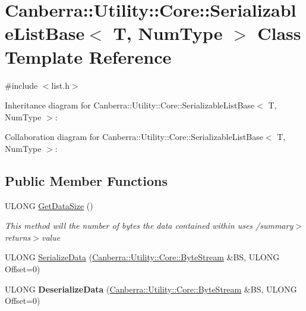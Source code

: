 \hypertarget{class_canberra_1_1_utility_1_1_core_1_1_serializable_list_base}{}\section{Canberra\+:\+:Utility\+:\+:Core\+:\+:Serializable\+List\+Base$<$ T, Num\+Type $>$ Class Template Reference}
\label{class_canberra_1_1_utility_1_1_core_1_1_serializable_list_base}


{\ttfamily \#include $<$list.\+h$>$}



Inheritance diagram for Canberra\+:\+:Utility\+:\+:Core\+:\+:Serializable\+List\+Base$<$ T, Num\+Type $>$\+:


Collaboration diagram for Canberra\+:\+:Utility\+:\+:Core\+:\+:Serializable\+List\+Base$<$ T, Num\+Type $>$\+:
\subsection*{Public Member Functions}
\begin{DoxyCompactItemize}
\item 
U\+L\+O\+NG \hyperlink{class_canberra_1_1_utility_1_1_core_1_1_serializable_list_base_a98ebee1f5c5ff3357e2602c0201c95f0_a98ebee1f5c5ff3357e2602c0201c95f0}{Get\+Data\+Size} ()
\begin{DoxyCompactList}\small\item\em This method will the number of bytes the data contained within uses /summary$>$ returns$>$value\end{DoxyCompactList}\item 
U\+L\+O\+NG \hyperlink{class_canberra_1_1_utility_1_1_core_1_1_serializable_list_base_a4a6021089fa90d9534541e6093972970_a4a6021089fa90d9534541e6093972970}{Serialize\+Data} (\hyperlink{class_canberra_1_1_utility_1_1_core_1_1_byte_stream}{Canberra\+::\+Utility\+::\+Core\+::\+Byte\+Stream} \&BS, U\+L\+O\+NG Offset=0)
\item 
\mbox{\label{class_canberra_1_1_utility_1_1_core_1_1_serializable_list_base_ace559ab00eb5e0e40a5716bb5b09af39}} 
U\+L\+O\+NG {\bfseries Deserialize\+Data} (\hyperlink{class_canberra_1_1_utility_1_1_core_1_1_byte_stream}{Canberra\+::\+Utility\+::\+Core\+::\+Byte\+Stream} \&BS, U\+L\+O\+NG Offset=0)
\end{DoxyCompactItemize}
